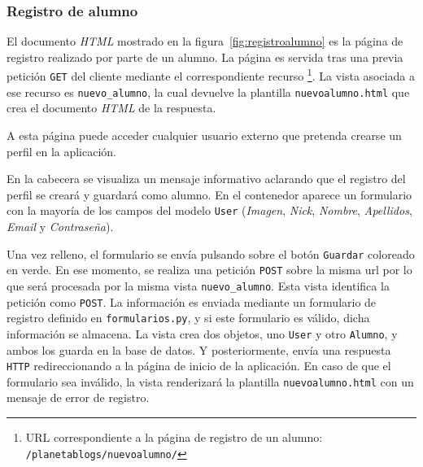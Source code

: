 \documentclass[a4paper, 12pt]{book}
\begin{document}
\subsubsection{Registro de alumno} 
\label{sec:registroalumno}
El documento \textit{HTML} mostrado en la figura~\ref{fig:registroalumno} es la p\'agina de registro realizado por parte de un alumno. La p\'agina es servida 
tras una previa petici\'on \texttt{GET} del cliente mediante el correspondiente recurso \footnote{URL correspondiente a la p\'agina de registro de un alumno: 
\texttt{/planetablogs/nuevoalumno/}}. La vista asociada a ese recurso es \texttt{nuevo\_alumno}, la cual devuelve la plantilla \texttt{nuevoalumno.html} 
que crea el documento \textit{HTML} de la respuesta.

A esta p\'agina puede acceder cualquier usuario externo que pretenda crearse un perfil en la aplicaci\'on.

En la cabecera se visualiza un mensaje informativo aclarando que el registro del perfil se crear\'a y guardar\'a como alumno. En el contenedor aparece un
formulario con la mayor\'ia de los campos del modelo \texttt{User} (\textit{Imagen}, \textit{Nick}, \textit{Nombre}, \textit{Apellidos}, \textit{Email} y 
\textit{Contrase\~na}).

Una vez relleno, el formulario se env\'ia pulsando sobre el bot\'on \texttt{Guardar} coloreado en verde. En ese momento, se realiza una petici\'on 
\texttt{POST} sobre la misma url por lo que ser\'a procesada por la misma vista \texttt{nuevo\_alumno}. Esta vista identifica la petici\'on como 
\texttt{POST}. La informaci\'on es enviada mediante un formulario de registro definido en \texttt{formularios.py}, y si este formulario es v\'alido, dicha
informaci\'on se almacena. La vista crea dos objetos, uno \texttt{User} y otro \texttt{Alumno}, y ambos los guarda en la base de datos. Y posteriormente, 
env\'ia una respuesta \texttt{HTTP} redireccionando a la p\'agina de inicio de la aplicaci\'on. En caso de que el formulario sea inv\'alido, la vista 
renderizar\'a la plantilla \texttt{nuevoalumno.html} con un mensaje de error de registro.
\end{document}
